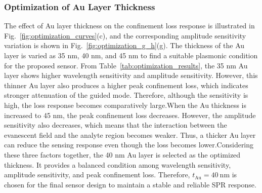 \documentclass[preprint,12pt]{elsarticle}
\begin{document}
\subsubsection{\textbf{{Optimization of Au Layer Thickness}}}
The effect of Au layer thickness on the confinement loss response is illustrated in Fig.~\ref{fig:optimization_curves}(c), and the corresponding amplitude sensitivity variation is shown in Fig.~\ref{fig:optimization_g_h}(g).
The thickness of the Au layer is varied as 35 nm, 40 nm, and 45 nm to find a suitable plasmonic condition for the proposed sensor. From Table~\ref{tab:optimization_results}, the 35 nm Au layer shows higher wavelength sensitivity and amplitude sensitivity. However, this thinner Au layer also produces a higher peak confinement loss, which indicates stronger attenuation of the guided mode. Therefore, although the sensitivity is high, the loss response becomes comparatively large.When the Au thickness is increased to 45 nm, the peak confinement loss decreases. However, the amplitude sensitivity also decreases, which means that the interaction between the evanescent field and the analyte region becomes weaker. Thus, a thicker Au layer can reduce the sensing response even though the loss becomes lower.Considering these three factors together, the 40 nm Au layer is selected as the optimized thickness. It provides a balanced condition among wavelength sensitivity, amplitude sensitivity, and peak confinement loss. Therefore, $t_{\mathrm{Au}} = 40~\mathrm{nm}$ is chosen for the final sensor design to maintain a stable and reliable SPR response.
\end{document}
